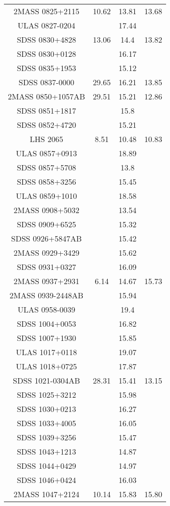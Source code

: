 \begin{table}
\begin{tabular}{cccc}
2MASS 0825+2115 & 10.62 & 13.81 & 13.68 \\
ULAS 0827-0204 &  & 17.44 &  \\
SDSS 0830+4828 & 13.06 & 14.4 & 13.82 \\
SDSS 0830+0128 &  & 16.17 &  \\
SDSS 0835+1953 &  & 15.12 &  \\
SDSS 0837-0000 & 29.65 & 16.21 & 13.85 \\
2MASS 0850+1057AB & 29.51 & 15.21 & 12.86 \\
SDSS 0851+1817 &  & 15.8 &  \\
SDSS 0852+4720 &  & 15.21 &  \\
LHS 2065 & 8.51 & 10.48 & 10.83 \\
ULAS 0857+0913 &  & 18.89 &  \\
SDSS 0857+5708 &  & 13.8 &  \\
SDSS 0858+3256 &  & 15.45 &  \\
ULAS 0859+1010 &  & 18.58 &  \\
2MASS 0908+5032 &  & 13.54 &  \\
SDSS 0909+6525 &  & 15.32 &  \\
SDSS 0926+5847AB &  & 15.42 &  \\
2MASS 0929+3429 &  & 15.62 &  \\
SDSS 0931+0327 &  & 16.09 &  \\
2MASS 0937+2931 & 6.14 & 14.67 & 15.73 \\
2MASS 0939-2448AB &  & 15.94 &  \\
ULAS 0958-0039 &  & 19.4 &  \\
SDSS 1004+0053 &  & 16.82 &  \\
SDSS 1007+1930 &  & 15.85 &  \\
ULAS 1017+0118 &  & 19.07 &  \\
ULAS 1018+0725 &  & 17.87 &  \\
SDSS 1021-0304AB & 28.31 & 15.41 & 13.15 \\
SDSS 1025+3212 &  & 15.98 &  \\
SDSS 1030+0213 &  & 16.27 &  \\
SDSS 1033+4005 &  & 16.05 &  \\
SDSS 1039+3256 &  & 15.47 &  \\
SDSS 1043+1213 &  & 14.87 &  \\
SDSS 1044+0429 &  & 14.97 &  \\
SDSS 1046+0424 &  & 16.03 &  \\
2MASS 1047+2124 & 10.14 & 15.83 & 15.80 \\

\end{tabular}
\end{table}
